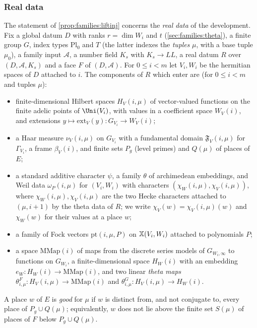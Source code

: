 \subsubsection{Real data}
The statement of \cref{prop:families:liftinj} concerns the \emph{real data} of the development. Fix a global datum $D$ with ranks
$r=\dim W_i$ and $t$ (\cref{sec:families:theta}), a finite group $G$, index types $\mathrm{Pl}_0$ and $T$ (the latter indexes the
\emph{tuples} $\mu$, with a base tuple $\mu_0$), a family input $\mathcal A$, a number field $K_s$ with $K_s\to\mathit{LL}$, a real datum $R$ over
$(D,\mathcal A,K_s)$ and a face $F$ of $(D,\mathcal A)$. For $0\le i<m$ let $V_i,W_i$ be the hermitian spaces of $D$ attached to $i$. The components of $R$
which enter are (for $0\le i<m$ and tuples $\mu$):
\begin{itemize}
\item finite-dimensional Hilbert spaces $H_V(i,\mu)$ of vector-valued functions on the finite adelic points of $\Uni(V_i)$, with values in a
coefficient space $W_V(i)$, and extensions $y\mapsto\mathrm{ext}_V(y):G_{V_i}\to W_V(i)$;
\item a Haar measure $\nu_V(i,\mu)$ on $G_{V_i}$ with a fundamental domain $\mathfrak F_V(i,\mu)$ for $\Gamma_{V_i}$, a frame $\beta_V(i)$, and finite sets
$P_g$ (level primes) and $Q(\mu)$ of places of $E$;
\item a standard additive character $\psi$, a family $\theta$ of archimedean embeddings, and Weil data $\omega_P(i,\mu)$ for $(V_i,W_i)$ with characters
$(\chi_W(i,\mu),\chi_V(i,\mu))$, where $\chi_W(i,\mu),\chi_V(i,\mu)$ are the two Hecke characters attached to $(\mu,i+1)$ by the theta data of $R$; we
write $\chi_V(w)=\chi_V(i,\mu)(w)$ and $\chi_W(w)$ for their values at a place $w$;
\item a family of Fock vectors $\mathrm{pt}(i,\mu,P)$ on $\mathbb{X}(V_i,W_i)$ attached to polynomials $P$;
\item a space $\mathrm{MMap}(i)$ of maps from the discrete series models of $G_{W_i,\infty}$ to functions on $G_{W_i}$, a finite-dimensional space
$H_W(i)$ with an embedding $e_W:H_W(i)\to\mathrm{MMap}(i)$, and two linear \emph{theta maps} $\theta^F_{i,\mu}:H_V(i,\mu)\to\mathrm{MMap}(i)$ and
$\theta^G_{i,\mu}:H_V(i,\mu)\to H_W(i)$.
\end{itemize}

A place $w$ of $E$ is \emph{good} for $\mu$ if $w$ is distinct from, and not conjugate to, every place of $P_g\cup Q(\mu)$; equivalently, $w$ does not lie
above the finite set $S(\mu)$ of places of $F$ below $P_g\cup Q(\mu)$.

